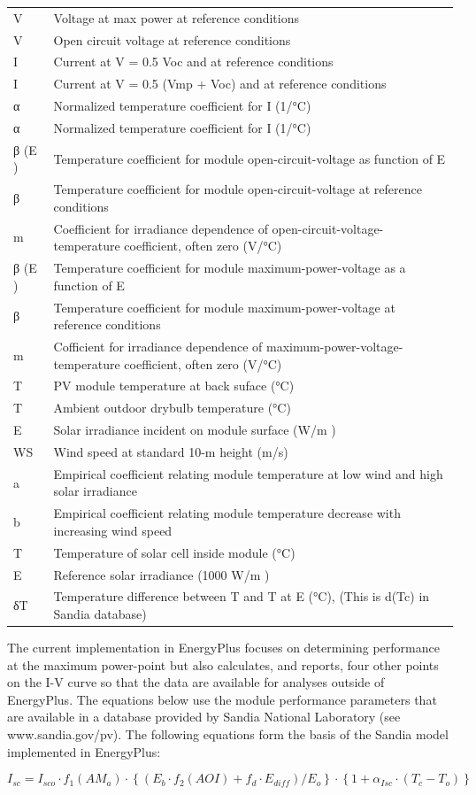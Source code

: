 \begin{longtable}[c]{p{1.5in}p{4.5in}}
V & Voltage at max power at reference conditions \tabularnewline
V & Open circuit voltage at reference conditions \tabularnewline
I & Current at V = 0.5 Voc and at reference conditions \tabularnewline
I & Current at V = 0.5 (Vmp + Voc) and at reference conditions \tabularnewline
α & Normalized temperature coefficient for I   (1/°C) \tabularnewline
α & Normalized temperature coefficient for I   (1/°C) \tabularnewline
β  (E  ) & Temperature coefficient for module open-circuit-voltage as function of E \tabularnewline
β & Temperature coefficient for module open-circuit-voltage at reference conditions \tabularnewline
m & Coefficient for irradiance dependence of open-circuit-voltage-temperature coefficient, often zero (V/°C) \tabularnewline
β  (E  ) & Temperature coefficient for module maximum-power-voltage as a function of E \tabularnewline
β & Temperature coefficient for module maximum-power-voltage at reference conditions \tabularnewline
m & Cofficient for irradiance dependence of maximum-power-voltage-temperature coefficient, often zero (V/°C) \tabularnewline
T & PV module temperature at back suface (°C) \tabularnewline
T & Ambient outdoor drybulb temperature (°C) \tabularnewline
E & Solar irradiance incident on module surface (W/m  ) \tabularnewline
WS & Wind speed at standard 10-m height (m/s) \tabularnewline
a & Empirical coefficient relating module temperature at low wind and high solar irradiance \tabularnewline
b & Empirical coefficient relating module temperature decrease with increasing wind speed \tabularnewline
T & Temperature of solar cell inside module (°C) \tabularnewline
E & Reference solar irradiance (1000 W/m  ) \tabularnewline
δT & Temperature difference between T   and T  at E  (°C), (This is d(Tc) in Sandia database) \tabularnewline
\bottomrule
\end{longtable}

The current implementation in EnergyPlus focuses on determining performance at the maximum power-point but also calculates, and reports, four other points on the I-V curve so that the data are available for analyses outside of EnergyPlus. The equations below use the module performance parameters that are available in a database provided by Sandia National Laboratory (see www.sandia.gov/pv). The following equations form the basis of the Sandia model implemented in EnergyPlus:

\begin{equation}
{I_{sc}} = {I_{sco}} \cdot {f_1}\left( {A{M_a}} \right) \cdot \left\{ {\left( {{E_b} \cdot {f_2}\left( {AOI} \right) + {f_d} \cdot {E_{diff}}} \right)/{E_o}} \right\} \cdot \left\{ {1 + {\alpha_{Isc}} \cdot \left( {{T_c} - {T_o}} \right)} \right\}
\end{equation}

